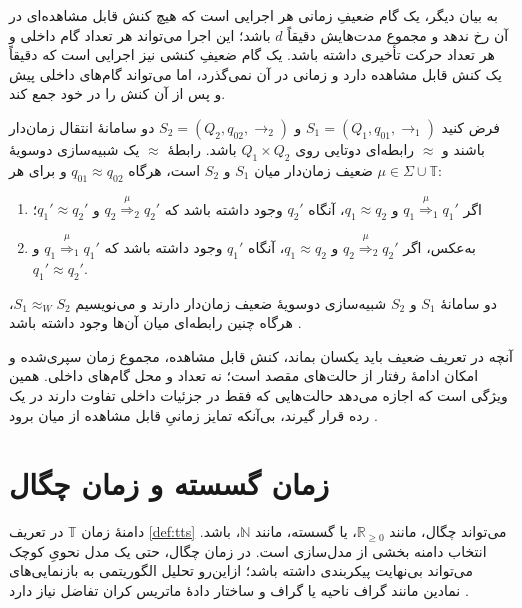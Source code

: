 به بیان دیگر، یک گام ضعیفِ زمانی هر اجرایی است که هیچ کنش قابل مشاهده‌ای در آن رخ ندهد و مجموع مدت‌هایش دقیقاً $d$ باشد؛ این اجرا می‌تواند هر تعداد گام داخلی و هر تعداد حرکت تأخیری داشته باشد. یک گام ضعیفِ کنشی نیز اجرایی است که دقیقاً یک کنش قابل مشاهده دارد و زمانی در آن نمی‌گذرد، اما می‌تواند گام‌های داخلی پیش و پس از آن کنش را در خود جمع کند.

\begin{definition}
\label{def:weak-timed-bisimulation}
فرض کنید $S_1=(Q_1,q_{01},\rightarrow_1)$ و $S_2=(Q_2,q_{02},\rightarrow_2)$ دو سامانهٔ انتقال زمان‌دار باشند و $\approx$ رابطه‌ای دوتایی روی $Q_1\times Q_2$ باشد. رابطهٔ $\approx$ یک شبیه‌سازی دوسویهٔ ضعیف زمان‌دار میان $S_1$ و $S_2$ است، هرگاه $q_{01}\approx q_{02}$ و برای هر $\mu\in\Sigma\cup\mathbb{T}$:
\begin{enumerate}
\item اگر $q_1\overset{\mu}{\Rightarrow}_1q_1'$ و $q_1\approx q_2$، آنگاه $q_2'$ وجود داشته باشد که $q_2\overset{\mu}{\Rightarrow}_2q_2'$ و $q_1'\approx q_2'$؛
\item به‌عکس، اگر $q_2\overset{\mu}{\Rightarrow}_2q_2'$ و $q_1\approx q_2$، آنگاه $q_1'$ وجود داشته باشد که $q_1\overset{\mu}{\Rightarrow}_1q_1'$ و $q_1'\approx q_2'$.
\end{enumerate}
دو سامانهٔ $S_1$ و $S_2$ شبیه‌سازی دوسویهٔ ضعیف زمان‌دار دارند و می‌نویسیم $S_1\approx_WS_2$، هرگاه چنین رابطه‌ای میان آن‌ها وجود داشته باشد \cite{BerardEtAl2008,ReynierSangnier2009}.
\end{definition}

آنچه در تعریف ضعیف باید یکسان بماند، کنش قابل مشاهده، مجموع زمان سپری‌شده و امکان ادامهٔ رفتار از حالت‌های مقصد است؛ نه تعداد و محل گام‌های داخلی. همین ویژگی است که اجازه می‌دهد حالت‌هایی که فقط در جزئیات داخلی تفاوت دارند در یک رده قرار گیرند، بی‌آنکه تمایز زمانیِ قابل مشاهده از میان برود \cite{BerardEtAl2008,ReynierSangnier2009}.

\section{زمان گسسته و زمان چگال}

دامنهٔ زمان $\mathbb{T}$ در تعریف \ref{def:tts} می‌تواند چگال، مانند $\mathbb{R}_{\geq0}$، یا گسسته، مانند $\mathbb{N}$، باشد. انتخاب دامنه بخشی از مدل‌سازی است. در زمان چگال، حتی یک مدل نحویِ کوچک می‌تواند بی‌نهایت پیکربندی داشته باشد؛ ازاین‌رو تحلیل الگوریتمی به بازنمایی‌های نمادین مانند گراف ناحیه یا گراف  و ساختار دادهٔ ماتریس کران تفاضل نیاز دارد \cite{AlurDill1994,HenzingerEtAl1994,BengtssonYi2004,LiebEtAl2025}.


